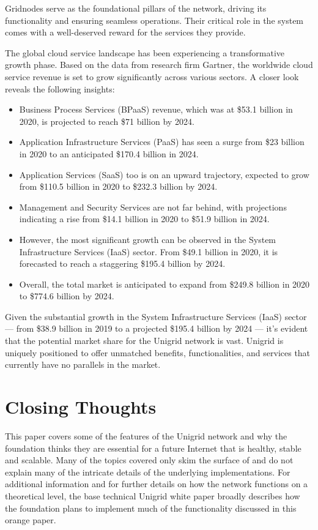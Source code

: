 \documentclass[a4paper,oneside]{article}
\begin{document}
\vspace{0.6cm}
\noindent Gridnodes serve as the foundational pillars of the network, driving its functionality and ensuring seamless operations. Their critical role in the system comes with a well-deserved reward for the services they provide.

The global cloud service landscape has been experiencing a transformative growth phase. Based on the data from research firm Gartner, the worldwide cloud service revenue is set to grow significantly across various sectors. A closer look reveals the following insights:

\begin{itemize}
    \item Business Process Services (BPaaS) revenue, which was at \$53.1 billion in 2020, is projected to reach \$71 billion by 2024.
    \item Application Infrastructure Services (PaaS) has seen a surge from \$23 billion in 2020 to an anticipated \$170.4 billion in 2024.
    \item Application Services (SaaS) too is on an upward trajectory, expected to grow from \$110.5 billion in 2020 to \$232.3 billion by 2024.
    \item Management and Security Services are not far behind, with projections indicating a rise from \$14.1 billion in 2020 to \$51.9 billion in 2024.
    \item However, the most significant growth can be observed in the System Infrastructure Services (IaaS) sector. From \$49.1 billion in 2020, it is forecasted to reach a staggering \$195.4 billion by 2024.
    \item Overall, the total market is anticipated to expand from \$249.8 billion in 2020 to \$774.6 billion by 2024.
\end{itemize}

Given the substantial growth in the System Infrastructure Services (IaaS) sector — from \$38.9 billion in 2019 to a projected \$195.4 billion by 2024 — it's evident that the potential market share for the Unigrid network is vast. Unigrid is uniquely positioned to offer unmatched benefits, functionalities, and services that currently have no parallels in the market.


\section{Closing Thoughts}
This paper covers some of the features of the Unigrid network and why the foundation thinks they are essential for a future Internet that is healthy, stable and scalable. Many of the topics covered only skim the surface of and do not explain many of the intricate details of the underlying implementations. For additional information and for further details on how the network functions on a theoretical level, the base technical Unigrid white paper \cite{wp2021} broadly describes how the foundation plans to implement much of the functionality discussed in this orange paper.
\end{document}
